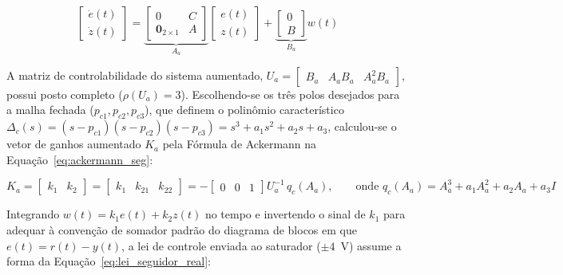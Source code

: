 \documentclass[a4paper,12pt]{article}
\begin{document}
\begin{equation}
    \begin{bmatrix} \dot{e}(t) \\ \dot{z}(t) \end{bmatrix} =
    \underbrace{\begin{bmatrix} 0 & C \\ \mathbf{0}_{2\times 1} & A \end{bmatrix}}_{A_a}
    \begin{bmatrix} e(t) \\ z(t) \end{bmatrix} +
    \underbrace{\begin{bmatrix} 0 \\ B \end{bmatrix}}_{B_a} w(t)
    \label{eq:sistema_aumentado}
\end{equation}

\begin{justify}
    \hspace{4ex}A matriz de controlabilidade do sistema aumentado, $U_a = \begin{bmatrix} B_a & A_a B_a & A_a^2 B_a \end{bmatrix}$, possui posto completo ($\rho(U_a) = 3$). Escolhendo-se os três polos desejados para a malha fechada ($p_{c1}, p_{c2}, p_{c3}$), que definem o polinômio característico $\Delta_c(s) = (s - p_{c1})(s - p_{c2})(s - p_{c3}) = s^3 + a_1 s^2 + a_2 s + a_3$, calculou-se o vetor de ganhos aumentado $K_a$ pela Fórmula de Ackermann na Equação~\eqref{eq:ackermann_seg}:
\end{justify}

\begin{equation}
    K_a = \begin{bmatrix} k_1 & k_2 \end{bmatrix} = \begin{bmatrix} k_1 & k_{21} & k_{22} \end{bmatrix} = -\begin{bmatrix} 0 & 0 & 1 \end{bmatrix} U_a^{-1}\, q_c(A_a), \qquad
    \text{onde } q_c(A_a) = A_a^3 + a_1 A_a^2 + a_2 A_a + a_3 I
    \label{eq:ackermann_seg}
\end{equation}

\begin{justify}
    \hspace{4ex}Integrando $w(t) = k_1 e(t) + k_2 z(t)$ no tempo e invertendo o sinal de $k_1$ para adequar à convenção de somador padrão do diagrama de blocos em que $e(t) = r(t) - y(t)$, a lei de controle enviada ao saturador ($\pm 4$~V) assume a forma da Equação~\eqref{eq:lei_seguidor_real}:
\end{justify}
\end{document}
